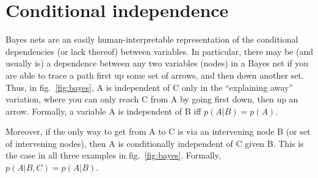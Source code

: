 \section{Conditional independence}

Bayes nets are an easily human-interpretable representation of the conditional
dependencies (or lack thereof) between variables. In particular, there may be
(and usually is) a dependence between any two variables (nodes) in a Bayes net
if you are able to trace a path first up some set of arrows, and then down
another set. Thus, in fig.~\ref{fig:bayes}, A is independent of C only in the
``explaining away'' variation, where you can only reach C from A by going first
down, then up an arrow. Formally, a variable A is independent of B iff 
$p(A|B) = p(A)$.

Moreover, if the only way to get from A to C is via an intervening node B (or set
of intervening nodes), then A is conditionally independent of C given B. This is
the case in all three examples in fig.~\ref{fig:bayes}. Formally, 
$p(A|B,C) = p(A|B)$.
